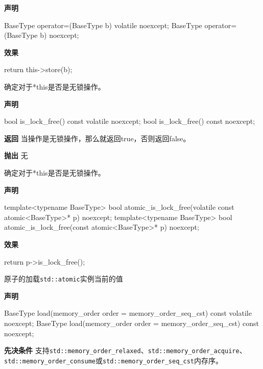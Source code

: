 \textbf{声明}

\begin{cpp}
BaseType operator=(BaseType b) volatile noexcept;
BaseType operator=(BaseType b) noexcept;
\end{cpp}

\textbf{效果}

\begin{cpp}
return this->store(b);
\end{cpp}


确定对于*this是否是无锁操作。

\textbf{声明}

\begin{cpp}
bool is_lock_free() const volatile noexcept;
bool is_lock_free() const noexcept;
\end{cpp}

\textbf{返回}
当操作是无锁操作，那么就返回true，否则返回false。

\textbf{抛出}
无


确定对于*this是否是无锁操作。

\textbf{声明}

\begin{cpp}
template<typename BaseType>
bool atomic_is_lock_free(volatile const atomic<BaseType>* p) noexcept;
template<typename BaseType>
bool atomic_is_lock_free(const atomic<BaseType>* p) noexcept;
\end{cpp}

\textbf{效果}

\begin{cpp}
return p->is_lock_free();
\end{cpp}


原子的加载\texttt{std::atomic}实例当前的值

\textbf{声明}

\begin{cpp}
BaseType load(memory_order order = memory_order_seq_cst)
    const volatile noexcept;
BaseType load(memory_order order = memory_order_seq_cst) const noexcept;
\end{cpp}

\textbf{先决条件}
支持\texttt{std::memory\_order\_relaxed}、\texttt{std::memory\_order\_acquire}、\texttt{std::memory\_order\_consume}或\texttt{std::memory\_order\_seq\_cst}内存序。

